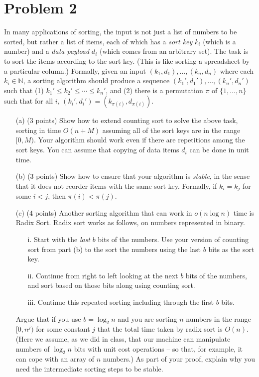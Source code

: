 \documentclass[12pt]{article}
\begin{document}
\section*{Problem 2}
In many applications of sorting, the input is not just a list of numbers to be sorted, but rather a list of items, each of which has a {\em sort key} $k_i$ (which is a number) and a {\em data payload} $d_i$ (which comes from an arbitrary set).  The task is to sort the items according to the sort key.  (This is like sorting a spreadsheet by a particular column.)  Formally, given an input $(k_1,d_1),\ldots,(k_n,d_n)$ where each $k_i\in \mathbb{N}$, a sorting algorithm should produce a sequence $(k_1',d_1'),\ldots,(k_n',d_n')$ such that (1) $k_1'\leq k_2'\leq \cdots \leq k_n'$, and (2) there is a permutation $\pi$ of $\{1,\ldots,n\}$ such that for all $i$, $(k_i',d_i')=(k_{\pi(i)},d_{\pi(i)})$.
\begin{enumerate}
\item[(a)] (3 points) Show how to extend counting sort to solve the above task, sorting in time $O(n+M)$ assuming all of the sort keys are in the range $[0,M)$.  Your algorithm should work even if there are repetitions among the sort keys. You can assume that copying of data items $d_i$ can be done in unit time.
\item[(b)] (3 points) Show how to ensure that your algorithm is {\em stable}, in the sense that it does not reorder items with the same sort key. Formally, if $k_i=k_j$ for some $i<j$, then $\pi(i)<\pi(j)$.
\item[(c)] (4 points) Another sorting algorithm that can work in $o(n \log n)$ time is Radix Sort.
Radix sort works as follows, on numbers represented in binary.
\begin{enumerate}
\item[i.] Start with the {\em last} $b$ bits of the numbers.  Use your version of counting sort from part (b) to the sort the numbers using the last $b$ bits as the sort key.
\item[ii.] Continue from right to left looking at the next $b$ bits of the numbers, and
sort based on those bits along using counting sort.
\item[iii.] Continue this repeated sorting including through the first $b$ bits.
\end{enumerate}

Argue that if you use $b = \log_2 n$ and you are sorting $n$ numbers
in the range $[0,n^j)$ for some constant $j$ that the total time taken
by radix sort is $O(n)$.  (Here we assume, as we did in class, that
our machine can manipulate numbers of $\log_2 n$ bits with unit cost
operations -- so that, for example, it can cope with an array of $n$
numbers.)  As part of your proof, explain why you need the
intermediate sorting steps to be stable.
\end{enumerate}
\end{document}
